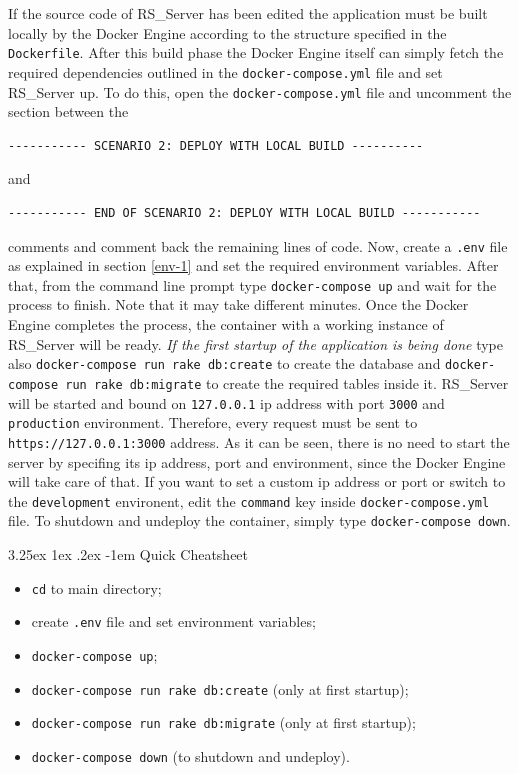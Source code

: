 \documentclass[a4paper, english]{article}
\makeatletter
\renewcommand\paragraph{\@startsection{paragraph}{5}{\z@}%
  {3.25ex \@plus1ex \@minus.2ex}%
  {-1em}%
  {\normalfont\normalsize\bfseries}}
\makeatother
\begin{document}
If the source code of RS\_Server has been edited the application must be built locally by the Docker Engine according to the structure specified in the \verb|Dockerfile|. After this build phase the Docker Engine itself can simply fetch the required dependencies outlined in the \verb|docker-compose.yml| file and set RS\_Server up. To do this, open the \verb|docker-compose.yml| file and uncomment the section between the 
\begin{verbatim}
----------- SCENARIO 2: DEPLOY WITH LOCAL BUILD ----------
\end{verbatim}
and 
\begin{verbatim}
----------- END OF SCENARIO 2: DEPLOY WITH LOCAL BUILD -----------
\end{verbatim} 
comments and comment back the remaining lines of code. Now, create a \verb|.env| file as explained in section \ref{env-1} and set the required environment variables. After that, from the command line prompt type \verb|docker-compose up| and wait for the process to finish. Note that it may take different minutes. Once the Docker Engine completes the process, the container with a working instance of RS\_Server will be ready. \emph{If the first startup of the application is being done} type also \verb|docker-compose run rake db:create| to create the database and \verb|docker-compose run rake db:migrate| to create the required tables inside it. RS\_Server will be started and bound on \verb|127.0.0.1| ip address with port \verb|3000| and \verb|production| environment. Therefore, every request must be sent to \verb|https://127.0.0.1:3000| address. As it can be seen, there is no need to start the server by specifing its ip address, port and environment, since the Docker Engine will take care of that. If you want to set a custom ip address or port or switch to the \verb|development| environent, edit the \verb|command| key inside \verb|docker-compose.yml| file. To shutdown and undeploy the container, simply type \verb|docker-compose down|.

\paragraph{Quick Cheatsheet}

\begin{itemize}
\item \verb|cd| to main directory;
\item create \verb|.env| file and set environment variables;
\item \verb|docker-compose up|;
\item \verb|docker-compose run rake db:create| (only at first startup);
\item \verb|docker-compose run rake db:migrate| (only at first startup);
\item \verb|docker-compose down| (to shutdown and undeploy).
\end{itemize}
\end{document}
